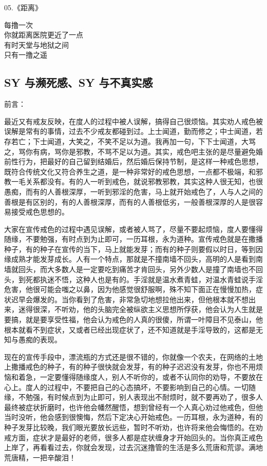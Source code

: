 \begin{multicols}{2}
    \begin{center}
        05.《距离》\it

        每撸一次 \\ 你就距离医院更近了一点 \\ 有时天堂与地狱之间 \\ 只有一撸之遥
    \end{center}
\end{multicols}

\subsection{SY 与濒死感、SY 与不真实感}

前言：

最近又有戒友反映，在度人的过程中被人误解，搞得自己很烦恼。其实劝人戒色被误解是常有的事情，过去不少戒友都碰到过。上士闻道，勤而修之；中士闻道，若存若亡；下士闻道，大笑之，不笑不足以为道。我再加一句，下下士闻道，大骂之，骂你有病，骂你是邪教，不骂不足以为道。其实，戒色吧主张的是尽量避免婚前性行为，把最好的自己留到结婚后，然后婚后保持节制，是这样一种戒色思想，既符合传统文化又符合养生之道，是一种非常好的戒色思想，一点都不极端，和邪教一毛关系都没有。有的人一听到戒色，就说邪教邪教，其实这种人很无知，也很愚痴，而有的人善根深厚，一听到邪淫的危害，马上就开始戒色了，人与人之间的善根是有区别的，有的人善根深厚，而有的人善根低劣，一般善根深厚的人是很容易接受戒色思想的。

大家在宣传戒色的过程中遇见误解，或者被人骂了，尽量不要起烦恼，度人要懂得随缘，不要勉强，有时点到为止即可，一历耳根，永为道种。宣传戒色就是在撒播种子，有的种子在宣传的当下，马上就能发芽；而有的种子则要假以时日，等到因缘成熟才能发芽成长。人有一个特点，那就是不撞南墙不回头，高明的人是看到南墙就回头，而大多数人是一定要吃到痛苦才肯回头，另外少数人是撞了南墙也不回头，到死都执迷不悟，这种人也是有的。手淫就是温水煮青蛙，对温水青蛙说手淫危害，他很可能会嗤之以鼻，因为他感觉很舒服啊，殊不知下面正在慢慢加热，症状迟早会爆发的。当你看到了危害，非常急切地想拉他出来，但他根本就不想出来，迷得很深，不听劝，他的头脑完全被纵欲主义思想所俘获，他会认为人生就是要搞，就是要享受性福，他会认为戒色的人真的很傻，所谓一叶障目不见泰山，他根本就看不到症状，又或者已经出现症状了，还不知道就是手淫导致的，这都是无知与愚痴的表现。

现在的宣传手段中，漂流瓶的方式还是很不错的，你就像一个农夫，在网络的土地上撒播戒色的种子，有的种子很快就会发芽，有的种子迟迟没有发芽，你也不用烦恼和着急，一定要懂得随缘度人，别人不听你的，或者不认同你的劝导，不要放在心上。度人的过程中，不要把自己的心态搞坏，不要影响到自己的心情。一切随缘，不勉强，有时候点到为止即可，别人表现出不耐烦时，就不要再劝了，很多人最终被症状折磨时，也许他会幡然醒悟，想到曾经有一个人真心劝过他戒色，但他当时没听，他会感到很懊悔，然后下定决心开始戒色。一历耳根，永为道种，有的种子发芽比较晚，我们眼光要放长远些，暂时不听劝，也许将来他会悔悟的。在劝戒方面，症状才是最好的老师，很多人都是症状缠身才开始回头的。当你真正戒色上岸了，再看看过去，你就会发现，过去沉迷撸管的生活是多么荒唐和荒谬。满地荒唐精，一把辛酸泪！

